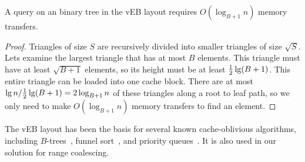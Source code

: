 \begin{lemma} 
A query on an binary tree in the vEB layout requires $O(\log_{B+1} n)$
memory transfers. 
\end{lemma}

\begin{proof} 
Triangles of size $S$ are recursively divided into smaller
triangles of size $\sqrt{S}$. Lets examine the largest triangle that has at most
$B$ elements. This triangle must have at least $\sqrt{B+1}$ elements, so its
height must be at least $\frac{1}{2}\lg \mathopen{}\left(B+1\right)\mathclose{}$. This entire triangle can be loaded
into one cache block. There are at most 
$\lg n/ \frac{1}{2}\lg \mathopen{}\left(B+1\right)\mathclose{} = 2 \log_{B+1} n$ 
of these triangles along a root to leaf path, so we only need to make
$O(\log_{B+1} n)$ memory transfers to find an element. 
\end{proof}

The vEB layout has been the basis for several known cache-oblivious algorithms, including 
$B$-trees~\cite{BayerMc72}, funnel sort~\cite{FrigoLePr99}, and priority 
queues~\cite{ArgeBeDe02,BrodalFa02}. It is also used in our solution for range coalescing. 



